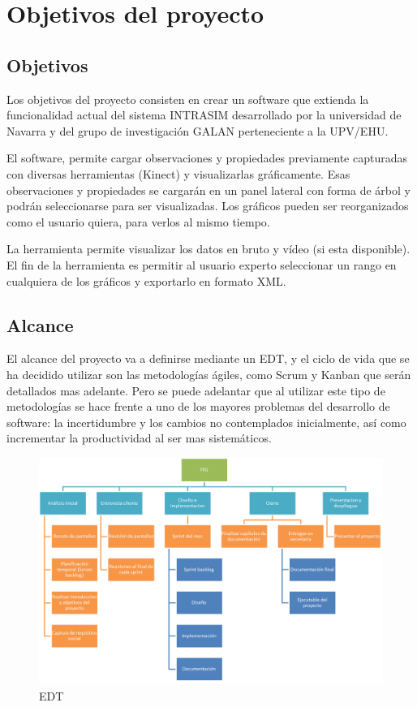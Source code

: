 \chapter{Objetivos del proyecto}


\section{Objetivos}
Los objetivos del proyecto consisten en crear un software que extienda la funcionalidad actual del sistema INTRASIM desarrollado 
por la universidad de Navarra y del grupo de investigación GALAN perteneciente a la UPV/EHU.

El software, permite cargar observaciones y propiedades previamente capturadas con diversas herramientas (Kinect) y
visualizarlas gr\'aficamente. Esas observaciones y propiedades se cargar\'an en un panel lateral con forma de \'arbol
y podr\'an seleccionarse para ser visualizadas. Los gr\'aficos pueden ser reorganizados como el
usuario quiera, para verlos al mismo tiempo.

La herramienta permite visualizar los datos en bruto y v\'{i}deo (si esta disponible). El fin de la herramienta es
permitir al usuario experto seleccionar un rango en cualquiera de los gr\'aficos y exportarlo en formato XML.

\section{Alcance}
El alcance del proyecto va a definirse mediante un EDT, y el ciclo de vida que se ha decidido utilizar son las metodolog\'ias
\'agiles, como Scrum y Kanban que ser\'an detallados mas adelante. Pero se puede adelantar que al utilizar este tipo
de metodolog\'ias se hace frente a uno de los mayores problemas del desarrollo de software: la incertidumbre y los cambios
no contemplados inicialmente, as\'i como incrementar la productividad al ser mas sistem\'aticos.
\begin{figure}[H]
    \centering
    \includegraphics[width=1\linewidth]{./Figures/EDT}
    \caption[Alcance del proyecto]{EDT}
    \label{fig:Alcance}
\end{figure}

